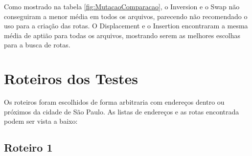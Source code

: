 \begin{center}
	\label{fig:MutacaoComparacao}
\end{center}

Como mostrado na tabela \ref{fig:MutacaoComparacao}, o Inversion e o Swap não conseguiram a menor média em todos os arquivos, parecendo não recomendado o uso para a criação das rotas. O Displacement e o Insertion encontraram a mesma média de aptião para todas os arquivos, mostrando serem as melhores escolhas para a busca de rotas.

\pagebreak
\section{Roteiros dos Testes}
Os roteiros foram escolhidos de forma arbitraria com endereços dentro ou próximos da cidade de São Paulo. As listas de endereços e as rotas encontrada podem ser vista a baixo:

\subsection{Roteiro 1}
\begin{center}
	\label{fig:Roteiro1}
\end{center}


